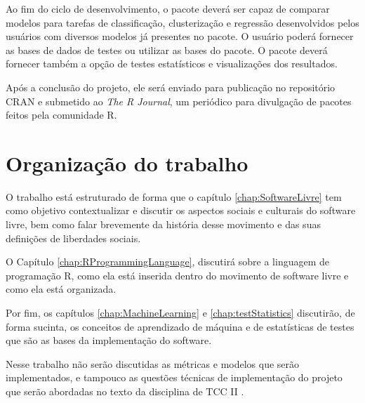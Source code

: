 Ao fim do ciclo de desenvolvimento, o pacote deverá ser capaz de comparar modelos para tarefas de classificação, clusterização e regressão desenvolvidos pelos usuários com diversos modelos já presentes no pacote.  O usuário poderá fornecer as bases de dados de testes ou utilizar as bases do pacote. O pacote deverá fornecer também a opção de testes estatísticos e visualizações dos resultados.

Após a conclusão do projeto, ele será enviado para publicação no repositório CRAN e submetido ao \textit{The R Journal}, um periódico para divulgação de pacotes feitos pela comunidade R.


\section{Organização do trabalho}
\label{sec:organizacaoTrabalho}

O trabalho está estruturado de forma que o capítulo \ref{chap:SoftwareLivre} tem como objetivo contextualizar e discutir os aspectos sociais e culturais do software livre, bem como falar brevemente da história desse movimento e das suas definições de liberdades sociais.

O Capítulo \ref{chap:RProgrammingLanguage}, discutirá sobre a linguagem de programação R, como ela está inserida dentro do movimento de software livre e como ela está organizada. 

Por fim, os capítulos \ref{chap:MachineLearning} e \ref{chap:testStatistics} discutirão, de forma sucinta, os conceitos de aprendizado de máquina e de estatísticas de testes que são as bases da implementação do software. 


Nesse trabalho não serão discutidas as métricas e modelos que serão implementados, e tampouco as questões técnicas de implementação do projeto que serão abordadas no texto da disciplina de TCC II .
